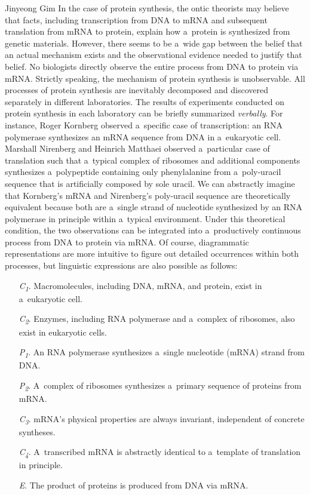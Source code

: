 \begin{artengenv}{Jinyeong Gim}
In the case of protein synthesis, the ontic theorists may believe that facts, including transcription from DNA to mRNA and subsequent translation from mRNA to protein, explain how a~protein is synthesized from genetic materials. However, there seems to be a~wide gap between the belief that an actual mechanism exists and the observational evidence needed to justify that belief. No biologists directly observe the entire process from DNA to protein via mRNA. Strictly speaking, the mechanism of protein synthesis is unobservable. All processes of protein synthesis are inevitably decomposed and discovered separately in different laboratories. The results of experiments conducted on protein synthesis in each laboratory can be briefly summarized \textit{verbally}. For instance, Roger Kornberg observed a~specific case of transcription: an RNA polymerase synthesizes an mRNA sequence from DNA in a~eukaryotic cell. Marshall Nirenberg and Heinrich Matthaei observed a~particular case of translation such that a~typical complex of ribosomes and additional components synthesizes a~polypeptide containing only phenylalanine from a~poly-uracil sequence that is artificially composed by sole uracil. We can abstractly imagine that Kornberg's mRNA and Nirenberg's poly-uracil sequence are theoretically equivalent because both are a~single strand of nucleotide synthesized by an RNA polymerase in principle within a~typical environment. Under this theoretical condition, the two observations can be integrated into a~productively continuous process from DNA to protein via mRNA. Of course, diagrammatic representations are more intuitive to figure out detailed occurrences within both processes, but linguistic expressions are also possible as follows:

\begin{itemize}
    \item[\textit{C}\textit{\textsubscript{1}}.] Macromolecules, including DNA, mRNA, and protein, exist in a~eukaryotic cell.
    \item[\textit{C}\textit{\textsubscript{2}}.] Enzymes, including RNA polymerase and a~complex of ribosomes, also exist in eukaryotic cells.
    \item[\textit{P}\textit{\textsubscript{1}}.] An RNA polymerase synthesizes a~single nucleotide (mRNA) strand from DNA.
    \item[\textit{P}\textit{\textsubscript{2}}.] A~complex of ribosomes synthesizes a~primary sequence of proteins from mRNA.
    \item[\textit{C}\textit{\textsubscript{3}}.] mRNA's physical properties are always invariant, independent of concrete syntheses.
    \item[\textit{C}\textit{\textsubscript{4}}.] A~transcribed mRNA is abstractly identical to a~template of translation in principle.
    \item[\textit{E}.] The product of proteins is produced from DNA via mRNA.
\end{itemize}



\end{artengenv}
